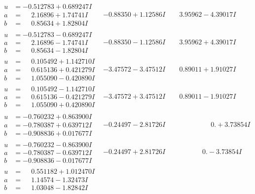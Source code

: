 \documentclass[1p]{elsarticle_modified}
\theoremstyle{definition}
\begin{document}
$$\begin{array}{c|c|c}
\begin{aligned}
u &= -0.512783 + 0.689247 I \\
a &= \phantom{-}2.16896 + 1.74741 I \\
b &= \phantom{-}0.85634 + 1.82804 I\end{aligned}
 & -0.88350 + 1.12586 I & \phantom{-}3.95962 - 4.39017 I \\ \hline\begin{aligned}
u &= -0.512783 - 0.689247 I \\
a &= \phantom{-}2.16896 - 1.74741 I \\
b &= \phantom{-}0.85634 - 1.82804 I\end{aligned}
 & -0.88350 - 1.12586 I & \phantom{-}3.95962 + 4.39017 I \\ \hline\begin{aligned}
u &= \phantom{-}0.105492 + 1.142710 I \\
a &= \phantom{-}0.615136 + 0.421279 I \\
b &= \phantom{-}1.055090 - 0.420890 I\end{aligned}
 & -3.47572 - 3.47512 I & \phantom{-}0.89011 + 1.91027 I \\ \hline\begin{aligned}
u &= \phantom{-}0.105492 - 1.142710 I \\
a &= \phantom{-}0.615136 - 0.421279 I \\
b &= \phantom{-}1.055090 + 0.420890 I\end{aligned}
 & -3.47572 + 3.47512 I & \phantom{-}0.89011 - 1.91027 I \\ \hline\begin{aligned}
u &= -0.760232 + 0.863900 I \\
a &= -0.780387 + 0.639712 I \\
b &= -0.908836 + 0.017677 I\end{aligned}
 & -0.24497 - 2.81726 I & \phantom{-0.000000 -}0. + 3.73854 I \\ \hline\begin{aligned}
u &= -0.760232 - 0.863900 I \\
a &= -0.780387 - 0.639712 I \\
b &= -0.908836 - 0.017677 I\end{aligned}
 & -0.24497 + 2.81726 I & \phantom{-0.000000 } 0. - 3.73854 I \\ \hline\begin{aligned}
u &= \phantom{-}0.551182 + 1.012470 I \\
a &= \phantom{-}1.14574 - 1.32473 I \\
b &= \phantom{-}1.03048 - 1.82842 I\end{aligned}

\end{array}$$
\end{document}
